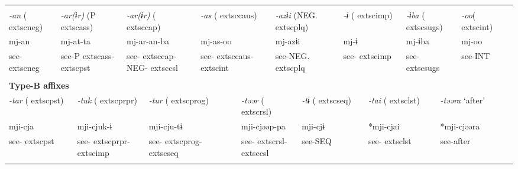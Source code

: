 \tabletail{}
\tablelasttail{}
\begin{tabularx}{\textwidth}{XXXXXXXXXXXXXXXXXXXXXX}
\lsptoprule
\multicolumn{22}{X}{{\bfseries Type-A affixes}}\\
\multicolumn{2}{X}{{ \textit{{}-an} (	extsc{neg})}} & \multicolumn{4}{X}{{ \textit{{}-ar(ɨr)} (P	extsc{ass})}} & \multicolumn{3}{X}{{ \textit{{}-ar(ɨr)} (	extsc{cap})}} & \multicolumn{4}{X}{{ \textit{{}-as} (	extsc{caus})}} & \multicolumn{3}{X}{{ \textit{{}-azɨi} (NEG.	extsc{plq})}} & \multicolumn{2}{X}{{ \textit{{}-ɨ} (	extsc{imp})}} & \multicolumn{2}{X}{{ \textit{{}-ɨba} (	extsc{sugs})}} & { \textit{{}-oo}(	extsc{int})} & \\
\multicolumn{2}{X}{{ mj-an}} & \multicolumn{4}{X}{{ mj-at-ta}} & \multicolumn{3}{X}{{ mj-ar-an-ba}} & \multicolumn{4}{X}{{ mj-as-oo}} & \multicolumn{3}{X}{{ mj-azɨi}} & \multicolumn{2}{X}{{ mj-ɨ}} & \multicolumn{2}{X}{{ mj-ɨba}} & { mj-oo} & \\
\multicolumn{2}{X}{see-	extsc{neg}} & \multicolumn{4}{X}{see-P	extsc{ass}-	extsc{pst}} & \multicolumn{3}{X}{see-	extsc{cap}-NEG-	extsc{csl}} & \multicolumn{4}{X}{see-	extsc{caus}-	extsc{int}} & \multicolumn{3}{X}{see-NEG.	extsc{plq}} & \multicolumn{2}{X}{see-	extsc{imp}} & \multicolumn{2}{X}{see-	extsc{sugs}} & see-INT & \\
\multicolumn{22}{X}{}\\
\multicolumn{22}{X}{{\bfseries Type-B affixes}}\\
\multicolumn{3}{X}{{ \textit{{}-tar} (	extsc{pst})}} & \multicolumn{5}{X}{{ \textit{{}-tuk} (	extsc{prpr})}} & \multicolumn{2}{X}{{ \textit{{}-tur} (	extsc{prog})}} & \multicolumn{4}{X}{{ \textit{{}-təər} (	extsc{rsl})}} & \multicolumn{3}{X}{{ \textit{{}-tɨ} (	extsc{seq})}} & \multicolumn{2}{X}{{ \textit{{}-tai} (	extsc{lst})}} & \multicolumn{3}{X}{{ \textit{{}-təəra} ‘after’}}\\
\multicolumn{3}{X}{{ mji-cja}} & \multicolumn{5}{X}{{ mji-cjuk-ɨ}} & \multicolumn{2}{X}{{ mji-cju-tɨ}} & \multicolumn{4}{X}{{ mji-cjəəp-pa}} & \multicolumn{3}{X}{{ mji-cjɨ}} & \multicolumn{2}{X}{{ *mji-cjai}} & \multicolumn{3}{X}{{ *mji-cjəəra}}\\
\multicolumn{3}{X}{see-	extsc{pst}} & \multicolumn{5}{X}{see-	extsc{prpr}-	extsc{imp}} & \multicolumn{2}{X}{see-	extsc{prog}-	extsc{seq}} & \multicolumn{4}{X}{see-	extsc{rsl}-	extsc{csl}} & \multicolumn{3}{X}{see-SEQ} & \multicolumn{2}{X}{see-	extsc{lst}} & \multicolumn{3}{X}{{ see-after}}\\
\multicolumn{3}{X}{} & \multicolumn{5}{X}{} & \multicolumn{2}{X}{} & \multicolumn{4}{X}{} & \multicolumn{3}{X}{} & \multicolumn{2}{X}{} & \multicolumn{3}{X}{}\\

\end{tabularx}

